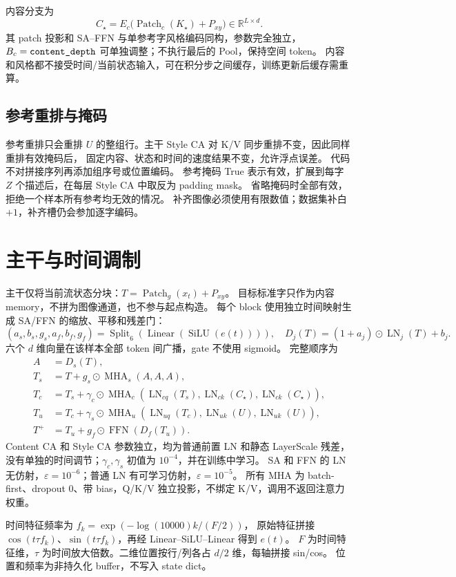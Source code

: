 \documentclass[UTF8,fontset=fandol,zihao=5,a4paper]{ctexart}
\newcommand{\code}[1]{\texttt{\detokenize{#1}}}
\newcommand{\LN}{\operatorname{LN}}
\newcommand{\MHA}{\operatorname{MHA}}
\newcommand{\FFN}{\operatorname{FFN}}
\begin{document}
内容分支为
\[
C_\star=E_c\bigl(\operatorname{Patch}_c(K_\star)+P_{xy}\bigr)\in\mathbb R^{L\times d}.
\]
其 patch 投影和 SA--FFN 与单参考字风格编码同构，参数完全独立，
$B_c=\code{content_depth}$ 可单独调整；不执行最后的 Pool，保持空间 token。
内容和风格都不接受时间/当前状态输入，可在积分步之间缓存，训练更新后缓存需重算。

\subsection{参考重排与掩码}

参考重排只会重排 $U$ 的整组行。主干 Style CA 对 K/V 同步重排不变，因此同样重排有效掩码后，
固定内容、状态和时间的速度结果不变，允许浮点误差。
代码不对拼接序列再添加组序号或位置编码。
参考掩码 True 表示有效，扩展到每字 $Z$ 个描述后，在每层 Style CA 中取反为 padding mask。
省略掩码时全部有效，拒绝一个样本所有参考均无效的情况。
补齐图像必须使用有限数值；数据集补白 $+1$，补齐槽仍会参加逐字编码。

\section{主干与时间调制}

主干仅将当前流状态分块：$T=\operatorname{Patch}_g(x_t)+P_{xy}$。
目标标准字只作为内容 memory，不拼为图像通道，也不参与起点构造。
每个 block 使用独立时间映射生成 SA/FFN 的缩放、平移和残差门：
\[
(a_s,b_s,g_s,a_f,b_f,g_f)=\operatorname{Split}_6(\operatorname{Linear}(\operatorname{SiLU}(e(t)))),
\quad D_j(T)=(1+a_j)\odot\LN_j(T)+b_j.
\]
六个 $d$ 维向量在该样本全部 token 间广播，gate 不使用 sigmoid。
完整顺序为
\begin{align*}
A&=D_s(T),\\
T_s&=T+g_s\odot\MHA_s(A,A,A),\\
T_c&=T_s+\gamma_c\odot\MHA_c(\LN_{cq}(T_s),\LN_{ck}(C_\star),\LN_{ck}(C_\star)),\\
T_u&=T_c+\gamma_s\odot\MHA_u(\LN_{uq}(T_c),\LN_{uk}(U),\LN_{uk}(U)),\\
T^+&=T_u+g_f\odot\FFN(D_f(T_u)).
\end{align*}
Content CA 和 Style CA 参数独立，均为普通前置 LN 和静态 LayerScale 残差，没有单独的时间调节；$\gamma_c,\gamma_s$ 初值为 $10^{-4}$，并在训练中学习。
SA 和 FFN 的 LN 无仿射，$\varepsilon=10^{-6}$；普通 LN 有可学习仿射，$\varepsilon=10^{-5}$。
所有 MHA 为 batch-first、dropout $0$、带 bias，Q/K/V 独立投影，不绑定 K/V，调用不返回注意力权重。

时间特征频率为 $f_k=\exp(-\log(10000)k/(F/2))$，
原始特征拼接 $\cos(t\tau f_k)$、$\sin(t\tau f_k)$，再经 Linear--SiLU--Linear 得到 $e(t)$。
$F$ 为时间特征维，$\tau$ 为时间放大倍数。二维位置按行/列各占 $d/2$ 维，每轴拼接 sin/cos。
位置和频率为非持久化 buffer，不写入 state dict。
\end{document}
